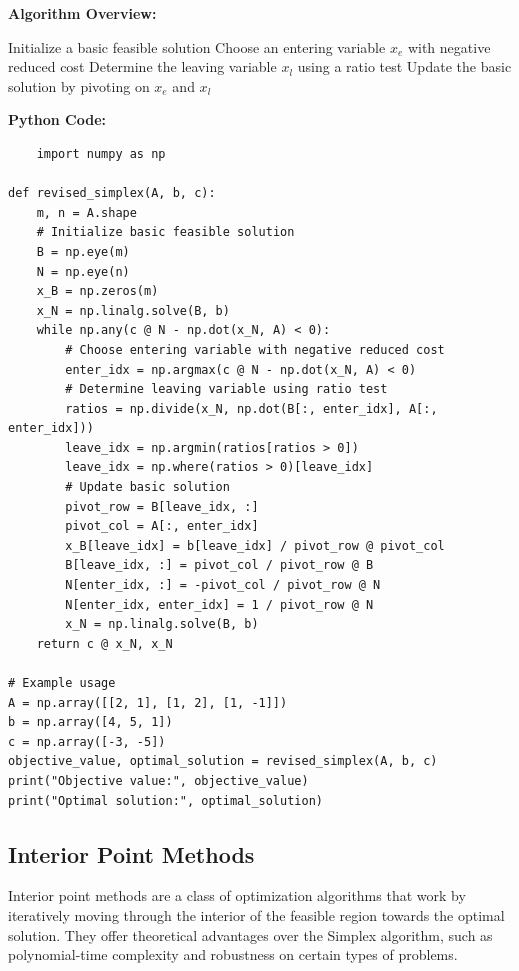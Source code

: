 \documentclass[12pt]{book} %
\begin{document}
\textbf{Algorithm Overview:}
\FloatBarrier
\begin{algorithm}[H]
\caption{Revised Simplex Method}
\begin{algorithmic}[1]
\State Initialize a basic feasible solution
\State Choose an entering variable \(x_e\) with negative reduced cost
\State Determine the leaving variable \(x_l\) using a ratio test
\State Update the basic solution by pivoting on \(x_e\) and \(x_l\)
\EndWhile
\end{algorithmic}
\end{algorithm}
\FloatBarrier
\textbf{Python Code:}
\FloatBarrier
\begin{lstlisting}
    import numpy as np

def revised_simplex(A, b, c):
    m, n = A.shape
    # Initialize basic feasible solution
    B = np.eye(m)
    N = np.eye(n)
    x_B = np.zeros(m)
    x_N = np.linalg.solve(B, b)
    while np.any(c @ N - np.dot(x_N, A) < 0):
        # Choose entering variable with negative reduced cost
        enter_idx = np.argmax(c @ N - np.dot(x_N, A) < 0)
        # Determine leaving variable using ratio test
        ratios = np.divide(x_N, np.dot(B[:, enter_idx], A[:, enter_idx]))
        leave_idx = np.argmin(ratios[ratios > 0])
        leave_idx = np.where(ratios > 0)[leave_idx]
        # Update basic solution
        pivot_row = B[leave_idx, :]
        pivot_col = A[:, enter_idx]
        x_B[leave_idx] = b[leave_idx] / pivot_row @ pivot_col
        B[leave_idx, :] = pivot_col / pivot_row @ B
        N[enter_idx, :] = -pivot_col / pivot_row @ N
        N[enter_idx, enter_idx] = 1 / pivot_row @ N
        x_N = np.linalg.solve(B, b)
    return c @ x_N, x_N

# Example usage
A = np.array([[2, 1], [1, 2], [1, -1]])
b = np.array([4, 5, 1])
c = np.array([-3, -5])
objective_value, optimal_solution = revised_simplex(A, b, c)
print("Objective value:", objective_value)
print("Optimal solution:", optimal_solution)
\end{lstlisting}


\subsection{Interior Point Methods}
Interior point methods are a class of optimization algorithms that work by iteratively moving through the interior of the feasible region towards the optimal solution. They offer theoretical advantages over the Simplex algorithm, such as polynomial-time complexity and robustness on certain types of problems.
\end{document}
